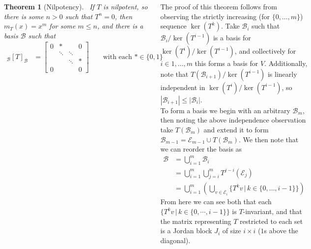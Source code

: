 \documentclass{tikzposter} %
\newtheorem{theorem}{Theorem}
\begin{document}
\begin{columns}
{   \begin{theorem}[Nilpotency]
     \ If $T$ is nilpotent, so there is some $n > 0$ such that $T^{n} = 0$, then $m_{T}(x) = x^{m}$ for some $m \le n$, and there is a basis $\mathcal{B}$ such that
     \begin{align*}
       \phantom{}_{\mathcal{B}}[T]_{\mathcal{B}} &= \begin{bmatrix}
                                 0 & * &   & 0 \\
                                   & \ddots & \ddots &   \\
                                   &   & \ddots & * \\
                                 0 &   &   & 0
                               \end{bmatrix} \qquad \text{with each $* \in \{0,1\}$}
     \end{align*}
   \end{theorem}
   \hphantom{}

   The proof of this theorem follows from observing the strictly increasing (for $\{0, \dots, m\}$) sequence $\ker(T^{k})$. Take $\mathcal{B}_{i}$ such that $\mathcal{B}_{i} / \ker(T^{i-1})$ is a basis for $\ker(T^{i}) / \ker(T^{i-1})$, and collectively for $i \in {1,\dots,m}$ this forms a basis for $V$. Additionally, note that $T(\mathcal{B}_{i+1}) / \ker(T^{i-1})$ is linearly independent in $\ker(T^{i}) / \ker(T^{i-1})$, so $|\mathcal{B}_{i+1}| \le |\mathcal{B}_{i}|$. \\

   To form a basis we begin with an arbitrary $\mathcal{B}_{m}$, then noting the above independence observation take $T(\mathcal{B}_{m})$ and extend it to form $\mathcal{B}_{m-1} = \mathcal{E}_{m-1} \cup T(\mathcal{B}_{m})$. We then note that we can reorder the basis as
   \begin{align*}
     \mathcal{B} &= \bigcup_{i=1}^{m} \mathcal{B}_{i} \\
     &= \bigcup_{i=1}^{m} \bigcup_{j=i}^{m} T^{j-i}(\mathcal{E}_{j}) \\
     &= \bigcup_{i=1}^{m} \left(\bigcup_{v \in \mathcal{E}_{i}} \{T^{k}v \,|\, k \in \{0, \dots, i-1\}\}\right)
   \end{align*}
   From here we can see both that each $\{T^{k}v \,|\, k \in \{0, \cdots, i-1\}\}$ is $T$-invariant, and that the matrix representing $T$ restricted to each set is a Jordan block $J_{i}$ of size $i \times i$ ($1$s above the diagonal). \\

}
\end{columns}
\end{document}
